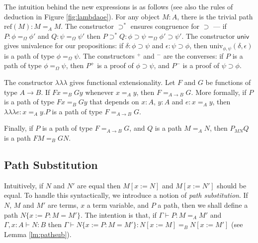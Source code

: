 \documentclass[a4paper,UKenglish]{lipics-v2016}
\newcommand*{\reff}[1]{\ensuremath{\mathrm{ref} \left( {#1} \right)}}
\newcommand*{\univ}[4]{\ensuremath{\mathrm{univ}_{{#1}, {#2}} \left({#3} , {#4} \right)}}
\newcommand*{\triplelambda}{\ensuremath{\lambda \!\! \lambda \!\! \lambda}}
\theoremstyle{plain}
\begin{document}
The intuition behind the new expressions is as follows (see also the rules of deduction in Figure \ref{fig:lambdaoe}).  For any object $M : A$, there is the trivial path $\reff{M} : M =_A M$.  The constructor $\supset^*$ ensures congruence for $\supset$ --- if $P : \phi =_\Omega \phi'$ and $Q : \psi =_\Omega \psi'$ then $P \supset^* Q : \phi \supset \psi =_\Omega \phi' \supset \psi'$.  The constructor $\mathsf{univ}$ gives univalence for our propositions: if $\delta : \phi \supset \psi$ and $\epsilon : \psi \supset \phi$, then $\univ{\phi}{\psi}{\delta}{\epsilon}$ is a path of type $\phi =_\Omega \psi$.  The constructors $^+$ and $^-$ are the converses: if $P$ is a path of type $\phi =_\Omega \psi$, then $P^+$ is a proof of $\phi \supset \psi$, and $P^-$ is a proof of $\psi \supset \phi$.

The constructor $\triplelambda$ gives functional extensionality.  Let $F$ and $G$ be functions of type $A \rightarrow B$.  If $F x =_B G y$ whenever $x =_A y$, then $F =_{A \rightarrow B} G$.  More formally, if $P$ is a path of type $Fx =_B Gy$ that depends on $x : A$, $y : A$ and $e : x =_A y$, then $\triplelambda e : x =_A y . P$ is a path of type $F =_{A \rightarrow B} G$.

Finally, if $P$ is a path of type $F =_{A \rightarrow B} G$, and $Q$ is a path $M =_A N$, then $P_{MN} Q$ is a path $FM =_B G N$.

\subsection{Path Substitution}

Intuitively, if $N$ and $N'$ are equal then $M[x:=N]$ and $M[x:=N']$ should be equal.  To handle this syntactically,
we introduce a notion of \emph{path substitution}.  If $N$, $M$ and $M'$ are terms, $x$ a term variable, and $P$ a path, then we shall define a path $N \{ x := P : M = M' \}$.  The intention is that, if
$\Gamma \vdash P : M =_A M'$ and $\Gamma, x : A \vdash N : B$ then $\Gamma \vdash N \{ x := P : M = M' \} : N [ x:= M ] =_B N [ x := M' ]$ (see Lemma \ref{lm:pathsub}). 
\end{document}
